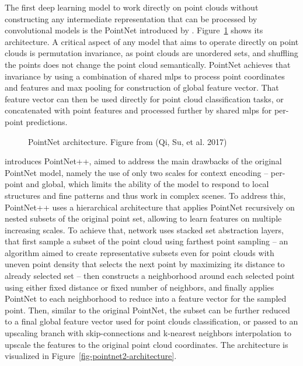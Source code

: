 The first deep learning model to work directly on point clouds without constructing any intermediate representation that can be processed by convolutional models is the PointNet introduced by \citet{qiPointNet2017}.
Figure~\ref{fig-pointnet-architecture} shows its architecture.
A critical aspect of any model that aims to operate directly on point clouds is permutation invariance, as point clouds are unordered sets, and shuffling the points does not change the point cloud semantically.
PointNet achieves that invariance by using a combination of shared \glspl{mlp} to process point coordinates and features and max pooling for construction of global feature vector.
That feature vector can then be used directly for point cloud classification tasks, or concatenated with point features and processed further by shared \glspl{mlp} for per-point predictions.

\begin{figure}
\caption[PointNet architecture]{\label{fig-pointnet-architecture}PointNet architecture. Figure
from (Qi, Su, et al. 2017)}
\end{figure}

\citet{qiPointNetPlusPlus2017} introduces PointNet++, aimed to address the main drawbacks of the original PointNet model, namely the use of only two scales for context encoding – per-point and global, which limits the ability of the model to respond to local structures and fine patterns and thus work in complex scenes.
To address this, PointNet++ uses a hierarchical architecture that applies PointNet recursively on nested subsets of the original point set, allowing to learn features on multiple increasing scales.
To achieve that, network uses stacked set abstraction layers, that first sample a subset of the point cloud using farthest point sampling – an algorithm aimed to create representative subsets even for point clouds with uneven point density that selects the next point by maximizing its distance to already selected set – then constructs a neighborhood around each selected point using either fixed distance or fixed number of neighbors, and finally applies PointNet to each neighborhood to reduce into a feature vector for the sampled point.
Then, similar to the original PointNet, the subset can be further reduced to a final global feature vector used for point clouds classification, or passed to an upscaling branch with skip-connections and k-nearest neighbors interpolation to upscale the features to the original point cloud coordinates.
The architecture is visualized in Figure~\ref{fig-pointnet2-architecture}.

